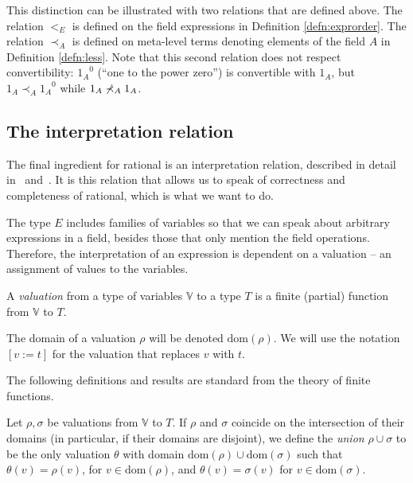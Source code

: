 \documentclass[numreferences]{kluwer}
\newcommand{\V}{{\mathbb V}}
\newcommand{\tacticname}[1]{\textsf{#1}}
\newcommand{\rational}{\tacticname{rational}}
\newcommand{\less}{\mathrel{\prec_A}}
\newcommand{\domain}{\ensuremath{\mathrm{dom}}}
\begin{document}
\begin{article}
This distinction
can be illustrated with two relations that are defined above.
The relation $<_E$ is defined on the field expressions in Definition \ref{defn:exprorder}.
The relation $\less$ is defined on meta-level terms denoting
elements of the field $A$ in Definition \ref{defn:less}.
Note that this second relation does not respect convertibility:
${1_A}^0$ (``one to the power zero'') is convertible with $1_A$, but $1_A \less {1_A}^0$ while $1_A \not\less 1_A$.


\subsection{The interpretation relation}\label{interpretation}

The final ingredient for {\rational}
is an interpretation relation, described in detail
in~\cite{geu:wie:zwa:00} and~\cite{lcf:wie:04}.
It is this relation that allows us to speak of correctness and completeness
of {\rational}, which is what we want to do.


The type $E$ includes families of variables so that we can
speak about arbitrary expressions in a field, besides those
that only mention the field operations.
Therefore, the interpretation of an expression is dependent on a valuation -- an assignment
of values to the variables.

\begin{definition} A \emph{valuation} from a type of variables $\V$
to a type $T$ is a finite (partial) function from $\V$ to $T$.
\end{definition}

\begin{notation}
The domain of a valuation $\rho$ will be denoted $\domain(\rho)$.
We will use the notation $[v:=t]$ for the valuation that
replaces $v$ with $t$.
\end{notation}

The following definitions and results are standard from the theory of
finite functions.

\begin{definition} Let $\rho,\sigma$ be valuations from $\V$ to $T$.
If $\rho$ and $\sigma$ coincide on the intersection of their domains
(in particular, if their domains are disjoint), we define the
\emph{union} $\rho\cup\sigma$ to be the only valuation $\theta$
with domain $\domain(\rho)\cup\domain(\sigma)$ such that $\theta(v)=\rho(v)$,
for $v\in\domain(\rho)$, and $\theta(v)=\sigma(v)$ for $v\in\domain(\sigma)$.
\end{definition}


\end{article}
\end{document}
